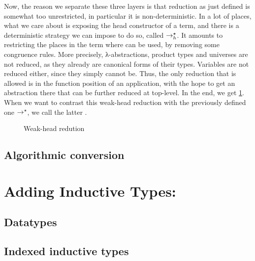 Now, the reason we separate these three layers is that reduction as just defined is
somewhat too unrestricted, in particular it is non-deterministic.
In a lot of places, what we care about is exposing the head
constructor of a term, and there is a deterministic strategy we can impose to do so, called
 $\rightarrow^{\star}_{h}$. It amounts to restricting the places in the term where
 can be used, by removing some congruence rules. More precisely,
λ-abstractions, product types and universes are not reduced, as they already are canonical
forms of their types. Variables are not reduced either, since they simply cannot be. Thus,
the only reduction that is allowed is in the function position of an application, with the
hope to get an abstraction there that can be further reduced at top-level. In the end,
we get \cref{fig:wh-red}. When we want to contrast this weak-head reduction with the
previously defined one $\rightarrow^{\star}$, we call the latter .
\begin{figure}[h]
  \caption{Weak-head redution}
  \label{fig:wh-red}
\end{figure}



\subsection{Algorithmic conversion}

\section{Adding Inductive Types: }

\subsection{Datatypes}

\subsection{Indexed inductive types}

